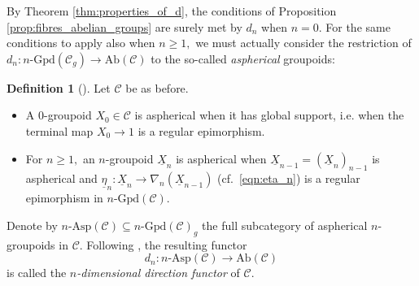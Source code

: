\documentclass[11pt]{amsart}
\theoremstyle{plain}
\theoremstyle{definition}
\newtheorem{definition}[subsubsection]{Definition}
\theoremstyle{remark}
\begin{document}
By Theorem \ref{thm:properties_of_d}, the conditions of Proposition \ref{prop:fibres_abelian_groups} are surely met by $d_n$ when $n=0.$ For the same conditions to apply also when $n\geq 1,$ we must actually consider the restriction of $d_n\colon n\text{-}\mathrm{Gpd}(\mathcal{C}_g)\rightarrow\mathrm{Ab}(\mathcal{C})$ to the so-called \emph{aspherical} groupoids:
\begin{definition}[\cite{aspherical, bourn-rodelo}]
Let $\mathcal{C}$ be as before.
\begin{itemize}
\item A $0$-groupoid $X_0\in\mathcal{C}$ is aspherical when it has global support, i.e. when the terminal map $X_0\rightarrow 1$ is a regular epimorphism.
\item For $n\geq 1,$ an $n$-groupoid $\underline{X}_n$ is aspherical when $\underline{X}_{n-1}=(\underline{X}_n)_{n-1}$ is aspherical and $\underline{\eta}_n\colon\underline{X}_n\rightarrow\nabla_n(\underline{X}_{n-1})$ (cf.~\eqref{eqn:eta_n}) is a regular epimorphism in $n\text{-}\mathrm{Gpd}(\mathcal{C}).$
\end{itemize}
\end{definition}
Denote by $n\text{-}\mathrm{Asp}(\mathcal{C})\subseteq n\text{-}\mathrm{Gpd}(\mathcal{C})_g$ the full subcategory of aspherical $n$-groupoids in $\mathcal{C}.$ Following \cite{bourn-rodelo}, the resulting functor
\begin{equation}
\label{eqn:d_n}
d_n\colon n\text{-}\mathrm{Asp}(\mathcal{C})\longrightarrow\mathrm{Ab}(\mathcal{C})
\end{equation}
is called the $n$\emph{-dimensional direction functor} of $\mathcal{C}.$
\end{document}
